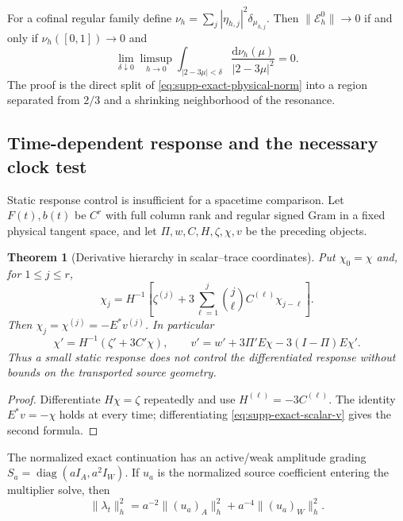 \documentclass[11pt]{article}
\newtheorem{theorem}{Theorem}[section]
\numberwithin{equation}{section}
\theoremstyle{definition}
\theoremstyle{remark}
\newcommand{\dd}{\mathrm d}
\begin{document}
For a cofinal regular family define
$\nu_h=\sum_j|\eta_{h,j}|^2\delta_{\mu_{h,j}}$.  Then
$\|\mathcal E_h^0\|\to0$ if and only if
$\nu_h([0,1])\to0$ and
\begin{equation}
 \lim_{\delta\downarrow0}\limsup_{h\to0}
 \int_{|2-3\mu|<\delta}\frac{\dd\nu_h(\mu)}{|2-3\mu|^2}=0.
 \label{eq:supp-exact-resonance-ui}
\end{equation}
The proof is the direct split of \eqref{eq:supp-exact-physical-norm} into a
region separated from $2/3$ and a shrinking neighborhood of the resonance.

\subsection{Time-dependent response and the necessary clock test}

Static response control is insufficient for a spacetime comparison.  Let
$F(t),b(t)$ be $C^r$ with full column rank and regular signed Gram in a fixed
physical tangent space, and let $\Pi,w,C,H,\zeta,\chi,v$ be the preceding
objects.

\begin{theorem}[Derivative hierarchy in scalar--trace coordinates]
\label{thm:supp-exact-time-hierarchy}
Put $\chi_0=\chi$ and, for $1\le j\le r$,
\begin{equation}
 \chi_j=H^{-1}\left[\zeta^{(j)}+
 3\sum_{\ell=1}^j\binom j\ell C^{(\ell)}\chi_{j-\ell}\right].
 \label{eq:supp-exact-time-sources}
\end{equation}
Then $\chi_j=\chi^{(j)}=-E^*v^{(j)}$.  In particular
\begin{equation}
 \chi'=H^{-1}(\zeta'+3C'\chi),\qquad
 v'=w'+3\Pi'E\chi-3(I-\Pi)E\chi'.
 \label{eq:supp-exact-first-time-source}
\end{equation}
Thus a small static response does not control the differentiated response
without bounds on the transported source geometry.
\end{theorem}
\begin{proof}
Differentiate $H\chi=\zeta$ repeatedly and use $H^{(\ell)}=-3C^{(\ell)}$.
The identity $E^*v=-\chi$ holds at every time; differentiating
\eqref{eq:supp-exact-scalar-v} gives the second formula.
\end{proof}

The normalized exact continuation has an active/weak amplitude grading
$S_a=\operatorname{diag}(aI_A,a^2I_W)$.  If $u_a$ is the normalized source
coefficient entering the multiplier solve, then
\begin{equation}
 \|\lambda_t\|_h^2=a^{-2}\|(u_a)_A\|_h^2
                    +a^{-4}\|(u_a)_W\|_h^2.
 \label{eq:supp-exact-rate-norm}
\end{equation}
\end{document}
